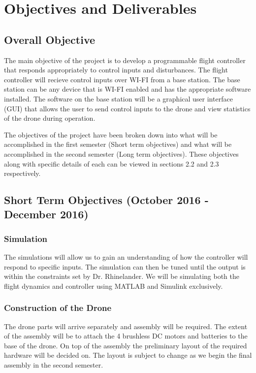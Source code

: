 \section{Objectives and Deliverables}
\subsection{Overall Objective}
The main objective of the project is to develop a programmable flight controller that responds appropriately to control inputs and disturbances. The flight controller will recieve control inputs over WI-FI from a base station. The base station can be any device that is WI-FI enabled and has the appropriate software installed. The software on the base station will be a graphical user interface (GUI) that allows the user to send control inputs to the drone and view statistics of the drone during operation. 

The objectives of the project have been broken down into what will be accomplished in the first semester (Short term objectives) and what will be accomplished in the second semester (Long term objectives). These objectives along with specific details of each can be viewed in sections 2.2 and 2.3 respectively.  

\subsection{Short Term Objectives (October 2016 - December 2016)}
\subsubsection{Simulation}

The simulations will allow us to gain an understanding of how the controller will respond to specific inputs. The simulation can then be tuned until the output is within the constraints set by Dr. Rhinelander. We will be simulating both the flight dynamics and controller using MATLAB and Simulink exclusively.

\subsubsection{Construction of the Drone}

The drone parts will arrive separately and assembly will be required. The extent of the assembly will be to attach the 4 brushless DC motors and batteries to the base of the drone. On top of the assembly the preliminary layout of the required hardware will be decided on. The layout is subject to change as we begin the final assembly in the second semester. 

